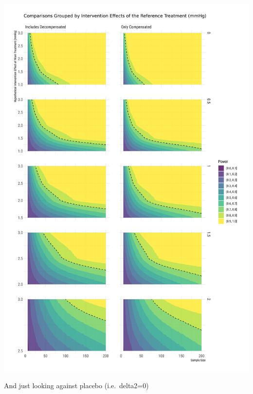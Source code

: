 \documentclass[
]{article}
\begin{document}
\includegraphics{figures/unnamed-chunk-77-2.png}

And just looking against placebo (i.e.~delta2=0)
\end{document}
